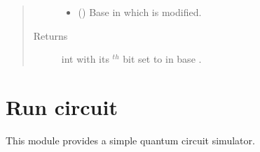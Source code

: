 \documentclass[letterpaper,10pt,english]{sphinxmanual}
\begin{document}
\begin{fulllineitems}
\begin{quote}
\begin{description}
\begin{itemize}
\item {} 
 () \textendash{} Base in which  is modified.

\end{itemize}

\item[{Returns}] \leavevmode
int \textendash{}  with its  \(^{th}\) bit set to  in base 
.

\end{description}\end{quote}

\end{fulllineitems}



\section{Run circuit}
\label{\detokenize{run_circuit:module-run_circuit}}\label{\detokenize{run_circuit:run-circuit}}\label{\detokenize{run_circuit::doc}}
This module provides a simple quantum circuit simulator.
\end{document}
